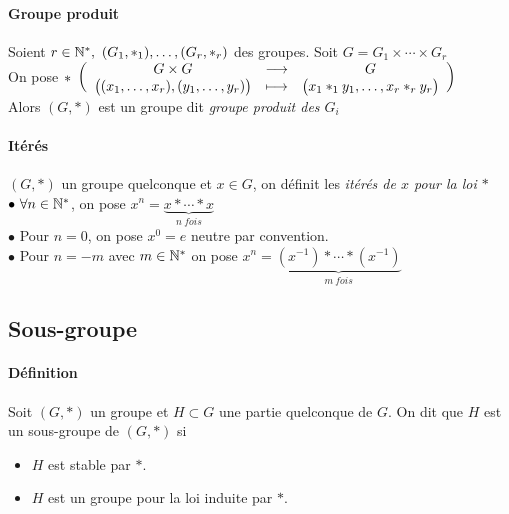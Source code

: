 		\paragraph{Groupe produit}
			Soient $r\in \N^* ,~(G_1,\ast_1),\dots ,(G_r,\ast_r)$ des groupes. Soit $G = G_1\times \cdots \times G_r$\\
			On pose $\ast ~\appli{G\times G}{\big((x_1,\dots ,x_r),(y_1,\dots,y_r)\big)}{G}{\big( x_1\ast_1 y_1 ,\dots , x_r\ast_ry_r\big)}$\\
			Alors \emph{$(G,\ast)$} est un groupe dit \emph{groupe produit des $G_i$}
		\traitdouble
		\paragraph{Itérés}
			$(G,\ast)$ un groupe quelconque et $x\in G$, on définit les \emph{itérés de $x$ pour la loi $\ast$}\\
			\hspace*{2cm} $\bullet ~\forall n\in\N^*$, on pose $x^n = \underbrace{x\ast\cdots \ast x}_{n~fois}$ \\
			\hspace*{2cm} $\bullet$ Pour $n=0$, on pose $x^0=e$ neutre par convention.\\
			\hspace*{2cm} $\bullet$ Pour $n=-m$ avec $m\in\N^*$ on pose $x^n = \underbrace{(x^{-1})\ast\cdots\ast (x^{-1})}_{m~fois}$ 
		\trait \medskip
		
		
	\subsection{Sous-groupe}
	
		\vspace{-15pt}	
		\traitd
		\paragraph{Définition}
			Soit $(G,\ast)$ un groupe et $H\subset G$ une partie quelconque de $G$. On dit que $H$ est un sous-groupe de $(G,\ast)$ si 
			\begin{itemize}
				\item $H$ est stable par $\ast$.
				\item $H$ est un groupe pour la loi induite par $\ast$.
			\end{itemize}
		\trait
		
		
